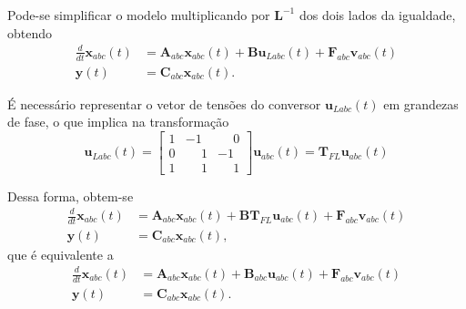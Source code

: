     Pode-se simplificar o modelo multiplicando por $\mathbf{L}^{-1}$ dos dois
    lados da igualdade, obtendo
    \begin{equation}
        \begin{split}
            \frac{d}{dt} \mathbf{x}_{abc}(t) & = \mathbf{A}_{abc} \mathbf{x}_{abc}(t) +
                \mathbf{Bu}_{Labc}(t) + \mathbf{F}_{abc} \mathbf{v}_{abc}(t) \\
            \mathbf{y}(t) & = \mathbf{C}_{abc} \mathbf{x}_{abc}(t) \text{.}
        \end{split}
    \end{equation}

    É necessário representar o vetor de tensões do conversor $\mathbf{u}_{Labc}(t)$ em
    grandezas de fase, o que implica na transformação
    \begin{equation}
        \mathbf{u}_{Labc}(t) = \left[
            \begin{array}{ccc}
                1 &           -1 & \phantom{-}0 \\[0.3em]
                0 & \phantom{-}1 &           -1 \\[0.3em]
                1 & \phantom{-}1 & \phantom{-}1
            \end{array}
        \right] \mathbf{u}_{abc}(t) = \mathbf{T}_{FL} \mathbf{u}_{abc}(t)
    \end{equation}

    Dessa forma, obtem-se
    \begin{equation}
        \begin{split}
            \frac{d}{dt} \mathbf{x}_{abc}(t) & = \mathbf{A}_{abc} \mathbf{x}_{abc}(t) +
                \mathbf{BT}_{FL} \mathbf{u}_{abc}(t) + \mathbf{F}_{abc} \mathbf{v}_{abc}(t) \\
            \mathbf{y}(t) & = \mathbf{C}_{abc} \mathbf{x}_{abc}(t) \text{,}
        \end{split}
    \end{equation}
    que é equivalente a
    \begin{equation}
        \begin{split}
            \frac{d}{dt} \mathbf{x}_{abc}(t) & = \mathbf{A}_{abc} \mathbf{x}_{abc}(t) +
                \mathbf{B}_{abc} \mathbf{u}_{abc}(t) + \mathbf{F}_{abc} \mathbf{v}_{abc}(t) \\
            \mathbf{y}(t) & = \mathbf{C}_{abc} \mathbf{x}_{abc}(t) \text{.}
        \end{split}
        \label{eq:LCL_abc_espaco_estados}
    \end{equation}

